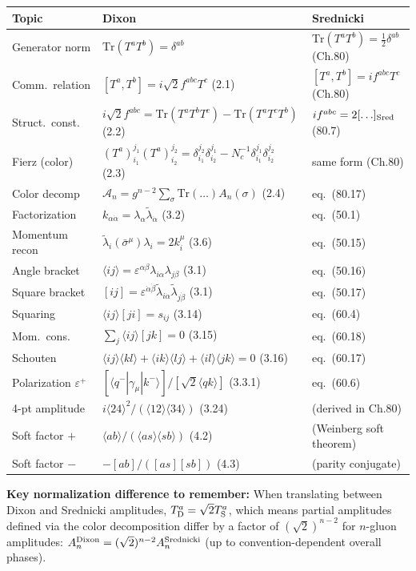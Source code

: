 \begin{center}
\renewcommand{\arraystretch}{1.5}
\begin{tabular}{@{}p{}p{}p{}@{}}
  \toprule
  \textbf{Topic} & \textbf{Dixon} & \textbf{Srednicki} \\
  \midrule
  Generator norm & $\mathrm{Tr}(T^aT^b)=\delta^{ab}$ & $\mathrm{Tr}(T^aT^b)=\tfrac{1}{2}\delta^{ab}$ (Ch.80) \\
  Comm.\ relation & $[T^a,T^b]=i\sqrt{2}f^{abc}T^c$ (2.1) & $[T^a,T^b]=if^{abc}T^c$ (Ch.80) \\
  Struct.\ const.\ & $i\sqrt{2}f^{abc}=\mathrm{Tr}(T^aT^bT^c)-\mathrm{Tr}(T^aT^cT^b)$ (2.2) & $if^{abc}=2[\ldots]_{\rm Sred}$ (80.7) \\
  Fierz (color) & $(T^a)_{i_1}^{j_1}(T^a)_{i_2}^{j_2}=\delta_{i_1}^{j_2}\delta_{i_2}^{j_1}-N_c^{-1}\delta_{i_1}^{j_1}\delta_{i_2}^{j_2}$ (2.3) & same form (Ch.80) \\
  Color decomp & $\mathcal{A}_n=g^{n-2}\sum_\sigma\mathrm{Tr}(\ldots)A_n(\sigma)$ (2.4) & eq.~(80.17) \\
  Factorization & $k_{\alpha\dot\alpha}=\lambda_\alpha\tilde\lambda_{\dot\alpha}$ (3.2) & eq.~(50.1) \\
  Momentum recon & $\tilde\lambda_i(\bar\sigma^\mu)\lambda_i=2k_i^\mu$ (3.6) & eq.~(50.15) \\
  Angle bracket & $\langle ij\rangle=\varepsilon^{\alpha\beta}\lambda_{i\alpha}\lambda_{j\beta}$ (3.1) & eq.~(50.16) \\
  Square bracket & $[ij]=\varepsilon^{\dot\alpha\dot\beta}\tilde\lambda_{i\dot\alpha}\tilde\lambda_{j\dot\beta}$ (3.1) & eq.~(50.17) \\
  Squaring & $\langle ij\rangle[ji]=s_{ij}$ (3.14) & eq.~(60.4) \\
  Mom.\ cons.\ & $\sum_j\langle ij\rangle[jk]=0$ (3.15) & eq.~(60.18) \\
  Schouten & $\langle ij\rangle\langle kl\rangle+\langle ik\rangle\langle lj\rangle+\langle il\rangle\langle jk\rangle=0$ (3.16) & eq.~(60.17) \\
  Polarization $\varepsilon^+$ & $[\langle q^-|\gamma_\mu|k^-\rangle]/[\sqrt{2}\langle qk\rangle]$ (3.3.1) & eq.~(60.6) \\
  4-pt amplitude & $i\langle 24\rangle^2/(\langle 12\rangle\langle 34\rangle)$ (3.24) & (derived in Ch.80) \\
  Soft factor $+$ & $\langle ab\rangle/(\langle as\rangle\langle sb\rangle)$ (4.2) & (Weinberg soft theorem) \\
  Soft factor $-$ & $-[ab]/([as][sb])$ (4.3) & (parity conjugate) \\
  \bottomrule
\end{tabular}
\end{center}

\bigskip
\noindent\textbf{Key normalization difference to remember:}
When translating between Dixon and Srednicki amplitudes, $T^a_{\rm D}=\sqrt{2}T^a_{\rm S}$,
which means partial amplitudes defined via the color decomposition differ by
a factor of $(\sqrt{2})^{n-2}$ for $n$-gluon amplitudes:
$A_n^{\rm Dixon} = (\sqrt{2})^{n-2} A_n^{\rm Srednicki}$ (up to convention-dependent overall phases).
